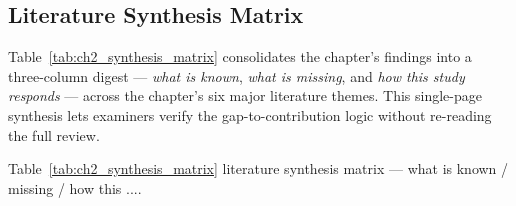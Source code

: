 \subsection*{Literature Synthesis Matrix}
\label{sec:ch2_synthesis_matrix}

\noindent Table~\ref{tab:ch2_synthesis_matrix} consolidates the chapter's findings into a three-column digest --- \emph{what is known}, \emph{what is missing}, and \emph{how this study responds} --- across the chapter's six major literature themes. This single-page synthesis lets examiners verify the gap-to-contribution logic without re-reading the full review.

\noindent Table~\ref{tab:ch2_synthesis_matrix} literature synthesis matrix --- what is known / missing / how this ....

